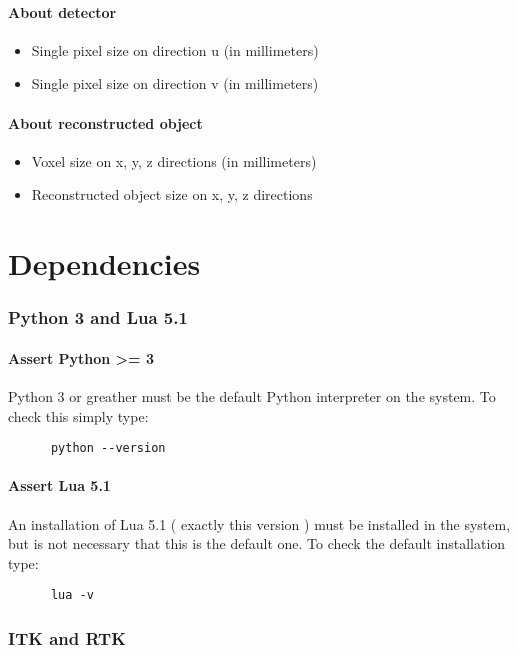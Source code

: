 \documentclass[a4paper,11pt, oneside]{article}
\begin{document}
    \subsection{ About detector }
    \begin{itemize}
      \item Single pixel size on direction u (in millimeters)
      \item Single pixel size on direction v (in millimeters)
    \end{itemize}
    
    \subsection{ About reconstructed object }
    \begin{itemize}
      \item Voxel size on x, y, z directions (in millimeters)
      \item Reconstructed object size on x, y, z directions
    \end{itemize}
    
  \part{ Dependencies }
    \section{ Python 3 and Lua 5.1 }
    \subsection{ Assert Python >= 3 }
    Python 3 or greather must be the default Python interpreter on the system. To check this simply type:
    \begin{lstlisting}
      python --version
    \end{lstlisting}
    \subsection{ Assert Lua 5.1 }
    An installation of Lua 5.1 ( exactly this version ) must be installed in the system, but is not necessary that this is the default one. To check the default installation type:
    \begin{lstlisting}
      lua -v
    \end{lstlisting}
    \section{ ITK and RTK }
\end{document}
